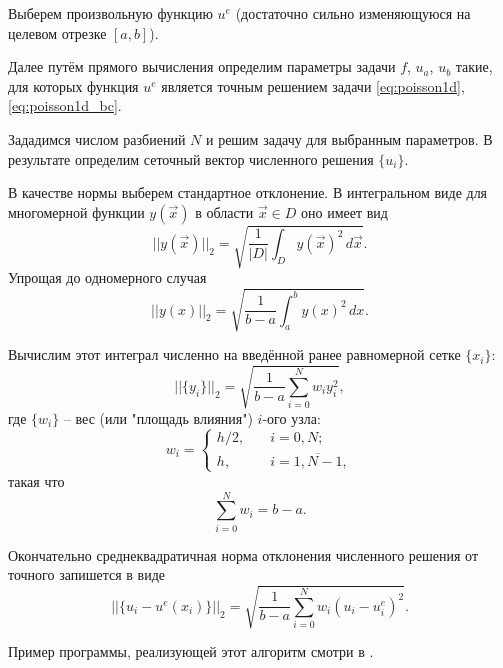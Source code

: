 Выберем произвольную функцию $u^e$ (достаточно сильно изменяющуюся на целевом отрезке $[a,b]$).

Далее путём прямого вычисления определим параметры задачи $f$, $u_a$, $u_b$ такие,
для которых функция $u^e$ является точным решением задачи \cref{eq:poisson1d}, \cref{eq:poisson1d_bc}.

Зададимся числом разбиений $N$ и решим задачу для выбранным параметров.
В результате определим сеточный вектор численного решения $\{u_i\}$.

В качестве нормы выберем стандартное отклонение. В интегральном виде для многомерной функции $y(\vec x)$
в области $\vec x\in D$ оно имеет вид
\begin{equation}
    \label{eq:norm2_common}
    ||y(\vec x)||_2 = \sqrt{\frac{1}{|D|}\int_{D} y(\vec x)^2 \, d\vec x}.
\end{equation}
Упрощая до одномерного случая
\begin{equation*}
    ||y(x)||_2 = \sqrt{\frac{1}{b-a}\int_{a}^{b} y(x)^2 \, dx}.
\end{equation*}

Вычислим этот интеграл численно на введённой ранее равномерной сетке $\{x_i\}$:
\begin{equation*}
    ||\{y_i\}||_2 = \sqrt{\frac{1}{b-a}\sum_{i=0}^{N} w_i y_i^2},
\end{equation*}
где $\{w_i\}$ -- вес (или "площадь влияния") $i$-ого узла:
\begin{equation*}
    w_i = \begin{cases}
        h/2, &\quad i=0, N;\\
        h, &\quad i=\overline{1,N-1},
    \end{cases}
\end{equation*}
такая что
\begin{equation*}
    \sum_{i=0}^{N} w_i = b-a.
\end{equation*}

Окончательно среднеквадратичная норма отклонения численного решения от точного запишется в виде
\begin{equation}
    \label{eq:poisson1d_fdm_norm}
    ||\{u_i - u^e(x_i)\}||_2 = \sqrt{\frac{1}{b-a}\sum_{i=0}^{N} w_i \left(u_i - u^e_i\right)^2}.
\end{equation}

Пример программы, реализующей этот алгоритм смотри в .
